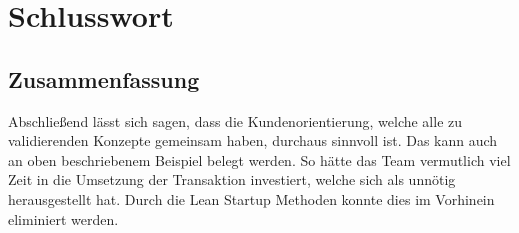 \chapter{Schlusswort}
\section{Zusammenfassung}
Abschließend lässt sich sagen, dass die Kundenorientierung, welche alle zu validierenden Konzepte gemeinsam haben, durchaus sinnvoll ist. Das kann auch an oben beschriebenem Beispiel belegt werden. So hätte das Team vermutlich viel Zeit in die Umsetzung der Transaktion investiert, welche sich als unnötig herausgestellt hat. Durch die Lean Startup Methoden konnte dies im Vorhinein eliminiert werden.
%
%
%

